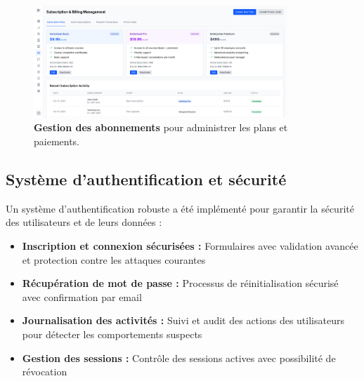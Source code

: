 \begin{figure}[H]
  \centering
  \includegraphics[width=0.85\textwidth,keepaspectratio]{old-reports/week_4_img/sub.jpeg}
  \caption{\textbf{Gestion des abonnements} pour administrer les plans et paiements.}
  \label{fig:subscription_management}
\end{figure}

\subsection{Système d'authentification et sécurité}

Un système d'authentification robuste a été implémenté pour garantir la sécurité des utilisateurs et de leurs données :

\begin{itemize}
  \item \textbf{Inscription et connexion sécurisées :} Formulaires avec validation avancée et protection contre les attaques courantes
  \item \textbf{Récupération de mot de passe :} Processus de réinitialisation sécurisé avec confirmation par email
  \item \textbf{Journalisation des activités :} Suivi et audit des actions des utilisateurs pour détecter les comportements suspects
  \item \textbf{Gestion des sessions :} Contrôle des sessions actives avec possibilité de révocation
\end{itemize}

